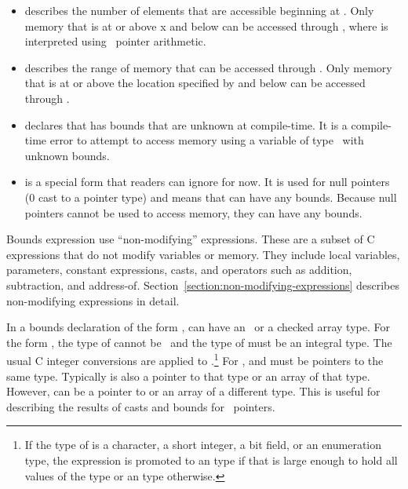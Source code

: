 \begin{itemize}
\item
   describes the number of
  elements that are accessible beginning at . Only memory that
  is at or above x and below  \code{+}  can be
  accessed through , where  \code{+}  is
  interpreted using \arrayptr\ pointer arithmetic.
\item
  describes the range of memory that can be accessed through .
  Only memory that is at or above the location specified by 
  and below  can be accessed through .
\item
   declares that  has bounds that
   are unknown at compile-time.
  It is a compile-time error to attempt to access memory using a
  variable of type \arrayptr\ with unknown bounds.
\item
   is a special form that readers can
  ignore for now. It is used for null pointers (0 cast to a pointer
  type) and means that  can have any bounds. Because null
  pointers cannot be used to access memory, they can have any bounds.
\end{itemize}

Bounds expression use ``non-modifying'' expressions. These are a subset
of C expressions that do not modify variables or memory. They include
local variables, parameters, constant expressions, casts, and operators
such as addition, subtraction, and address-of.
Section~\ref{section:non-modifying-expressions}  describes
non-modifying expressions in detail.

In a bounds declaration of the form ,
 can have an \arrayptr\ or a checked array type.
For the form  ,  the type of
 cannot be \arrayptrvoid\ and the type of  must be an integral type.
The usual C integer conversions are applied to .\footnote{If the
type of  is a character, a short integer, a bit field, or an enumeration type,
the expression is promoted to an  type if that is large
enough to  hold all values of the type or an  type otherwise.}
For ,  and
 must be pointers to the same type.  Typically  is also
a pointer to that type or an array of that type.
However,  can be a pointer to or an array of a different type.
This is useful for describing the results of casts and
bounds for \arrayptrvoid\ pointers.

